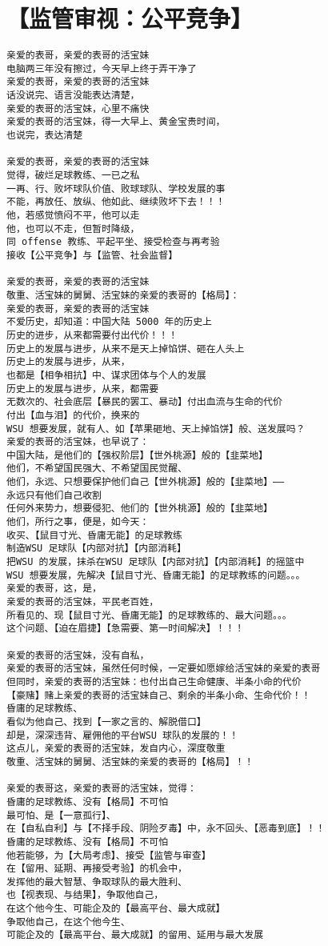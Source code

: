 \documentclass[9pt, b5paper]{article}
\begin{document}
\section{【监管审视：公平竞争】}
\label{sec-3}
\begin{verbatim}
亲爱的表哥，亲爱的表哥的活宝妹
电脑两三年没有擦过，今天早上终于弄干净了
亲爱的表哥，亲爱的表哥的活宝妹
话没说完、语言没能表达清楚，
亲爱的表哥的活宝妹，心里不痛快
亲爱的表哥的活宝妹，得一大早上、黄金宝贵时间，
也说完，表达清楚

亲爱的表哥，亲爱的表哥的活宝妹
觉得，破烂足球教练、一已之私
一再、行、败坏球队价值、败球球队、学校发展的事
不能，再放任、放纵、他如此、继续败坏下去！！！
他，若感觉愤闷不平，他可以走
他，也可以不走，但暂时降级，
同 offense 教练、平起平坐、接受检查与再考验
接收【公平竞争】与【监管、社会监督】

亲爱的表哥，亲爱的表哥的活宝妹
敬重、活宝妹的舅舅、活宝妹的亲爱的表哥的【格局】：
亲爱的表哥，亲爱的表哥的活宝妹
不爱历史，却知道：中国大陆 5000 年的历史上
历史的进步，从来都需要付出代价！！！
历史上的发展与进步，从来不是天上掉馅饼、砸在人头上
历史上的发展与进步，从来，
也都是【相争相抗】中、谋求团体与个人的发展
历史上的发展与进步，从来，都需要
无数次的、社会底层【暴民的罢工、暴动】付出血流与生命的代价
付出【血与泪】的代价，换来的
WSU 想要发展，就有人、如【苹果砸地、天上掉馅饼】般、送发展吗？
亲爱的表哥的活宝妹，也早说了：
中国大陆，是他们的【强权阶层】【世外桃源】般的【韭菜地】
他们，不希望国民强大、不希望国民觉醒、
他们，永远、只想要保护他们自己【世外桃源】般的【韭菜地】——
永远只有他们自己收割
任何外来势力，想要侵犯、他们的【世外桃源】般的【韭菜地】
他们，所行之事，便是，如今天：
收买、【鼠目寸光、昏庸无能】的足球教练
制造WSU 足球队【内部对抗】【内部消耗】
把WSU 的发展，抹杀在WSU 足球队【内部对抗】【内部消耗】的摇篮中
WSU 想要发展，先解决【鼠目寸光、昏庸无能】的足球教练的问题。。。
亲爱的表哥，这，是，
亲爱的表哥的活宝妹，平民老百姓，
所看见的、现【鼠目寸光、昏庸无能】的足球教练的、最大问题。。。
这个问题、【迫在眉捷】【急需要、第一时间解决】！！！

亲爱的表哥的活宝妹，没有自私，
亲爱的表哥的活宝妹，虽然任何时候，一定要如愿嫁给活宝妹的亲爱的表哥
但同时，亲爱的表哥的活宝妹：也付出自己生命健康、半条小命的代价 
【豪赌】赌上亲爱的表哥的活宝妹自己、剩余的半条小命、生命代价！！
昏庸的足球教练、
看似为他自己、找到【一家之言的、解脱借口】
却是，深深违背、雇佣他的平台WSU 球队的发展的！！
这点儿，亲爱的表哥的活宝妹，发自内心，深度敬重
敬重、活宝妹的舅舅、活宝妹的亲爱的表哥的【格局】！！

亲爱的表哥这，亲爱的表哥的活宝妹，觉得：
昏庸的足球教练、没有【格局】不可怕
最可怕、是【一意孤行】、
在【自私自利】与【不择手段、阴险歹毒】中，永不回头、【恶毒到底】！！
昏庸的足球教练、没有【格局】不可怕
他若能够，为【大局考虑】、接受【监管与审查】
在【留用、延期、再接受考验】的机会中，
发挥他的最大智慧、争取球队的最大胜利、
也【视表现、与结果】，争取他自己，
在这个他今生、可能企及的【最高平台、最大成就】
争取他自己，在这个他今生、
可能企及的【最高平台、最大成就】的留用、延用与最大发展


\end{verbatim}
\end{document}
